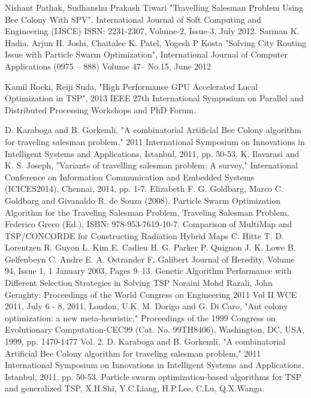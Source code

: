 \documentclass[conference]{IEEEtran}
\begin{document}
\begin{thebibliography}{00}
 Nishant Pathak, Sudhanshu Prakash Tiwari "Travelling Salesman Problem Using Bee Colony With SPV", International Journal of Soft Computing and Engineering (IJSCE) ISSN: 2231-2307, Volume-2, Issue-3, July 2012.
 Sarman K. Hadia, Arjun H. Joshi, Chaitalee K. Patel, Yogesh P Kosta "Solving City Routing Issue with Particle Swarm Optimization", International Journal of Computer Applications (0975 – 888) Volume 47– No.15, June 2012

 Kamil Rocki, Reiji Suda, "High Performance GPU Accelerated Local Optimization in TSP", 2013 IEEE 27th International Symposium on Parallel and Distributed Processing Workshops and PhD Forum.

 D. Karaboga and B. Gorkemli, "A combinatorial Artificial Bee Colony algorithm for traveling salesman problem," 2011 International Symposium on Innovations in Intelligent Systems and Applications, Istanbul, 2011, pp. 50-53.
 K. Ilavarasi and K. S. Joseph, "Variants of travelling salesman problem: A survey," International Conference on Information Communication and Embedded Systems (ICICES2014), Chennai, 2014, pp. 1-7.
 Elizabeth F. G. Goldbarg, Marco C. Goldbarg and Givanaldo R. de Souza (2008). Particle Swarm Optimization Algorithm for the Traveling Salesman Problem, Traveling Salesman Problem, Federico Greco (Ed.), ISBN: 978-953-7619-10-7.
 Comparison of MultiMap and TSP/CONCORDE for Constructing Radiation Hybrid Maps C. Hitte T. D. Lorentzen R. Guyon L. Kim E. Cadieu H. G. Parker P. Quignon J. K. Lowe B. Gelfenbeyn C. Andre E. A. Ostrander F. Galibert Journal of Heredity, Volume 94, Issue 1, 1 January 2003, Pages 9–13.
 Genetic Algorithm Performance with Different Selection Strategies in Solving TSP Noraini Mohd Razali, John Geraghty: Proceedings of the World Congress on Engineering 2011 Vol II WCE 2011, July 6 - 8, 2011, London, U.K.
 M. Dorigo and G. Di Caro, "Ant colony optimization: a new meta-heuristic," Proceedings of the 1999 Congress on Evolutionary Computation-CEC99 (Cat. No. 99TH8406), Washington, DC, USA, 1999, pp. 1470-1477 Vol. 2.
 D. Karaboga and B. Gorkemli, "A combinatorial Artificial Bee Colony algorithm for traveling salesman problem," 2011 International Symposium on Innovations in Intelligent Systems and Applications, Istanbul, 2011, pp. 50-53.
 Particle swarm optimization-based algorithms for TSP and generalized TSP, X.H.Shi, Y.C.Liang, H.P.Lee, C.Lu, Q.X.Wanga.

\end{thebibliography}
\end{document}
